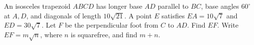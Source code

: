 An isosceles trapezoid $ABCD$ has longer base $AD$ parallel to $BC$, base angles $60^\circ$ at $A,D$, and diagonals of length $10\sqrt{21}$. A point $E$ satisfies $EA=10\sqrt7$ and $ED=30\sqrt7$. Let $F$ be the perpendicular foot from $C$ to $AD$. Find $EF$. Write $EF=m\sqrt n$, where $n$ is squarefree, and find $m+n$.

